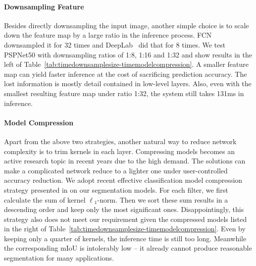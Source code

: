 \documentclass[runningheads]{llncs}
\begin{document}
\paragraph{Downsampling Feature}
Besides directly downsampling the input image, another simple choice is to scale down the feature map by a large ratio in the inference process. FCN~\cite{long2015fully} downsampled it for 32 times and DeepLab~\cite{chen2015semantic} did that for 8 times. We test PSPNet50 with downsampling ratios of 1:8, 1:16 and 1:32 and show results in the left of Table~\ref{tab:timedownsamplesize-timemodelcompression}. A smaller feature map can yield faster inference at the cost of sacrificing prediction accuracy. The lost information is mostly detail contained in low-level layers. Also, even with the smallest resulting feature map under ratio 1:32, the system still takes 131ms in inference. 

\paragraph{Model Compression}
Apart from the above two strategies, another natural way to reduce network complexity is to trim kernels in each layer. Compressing models becomes an active research topic in recent years due to the high demand. The solutions \cite{Iandola2016squeezenet,han2016deepcom,han2017dsd,li2017pruning} can make a complicated network reduce to a lighter one under user-controlled accuracy reduction. We adopt recent effective classification model compression strategy presented in \cite{li2017pruning} on our segmentation models. For each filter, we first calculate the sum of kernel $\ell$$_1$-norm. Then we sort these sum results in a descending order and keep only the most significant ones. Disappointingly, this strategy also does not meet our requirement given the compressed models listed in the right of Table~\ref{tab:timedownsamplesize-timemodelcompression}. Even by keeping only a quarter of kernels, the inference time is still too long. Meanwhile the corresponding mIoU is intolerably low -- it already cannot produce reasonable segmentation for many applications.
\end{document}
